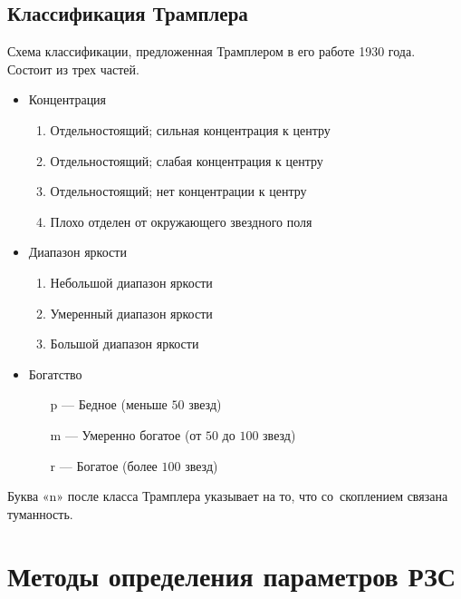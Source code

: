 \documentclass{beamer}
\begin{document}
    \subsection{Классификация Трамплера}
    \begin{frame}
        Схема классификации, предложенная Трамплером в его работе 1930 года\cite{TrumpClass}. Состоит из трех частей.
        \begin{itemize}
            \item Концентрация
                \begin{enumerate}[I ---]
                    \item Отдельностоящий; сильная концентрация к центру
                    \item Отдельностоящий; слабая концентрация к центру
                    \item Отдельностоящий; нет концентрации к центру
                    \item Плохо отделен от окружающего звездного поля
                \end{enumerate}
            \item Диапазон яркости
                \begin{enumerate}[1 ---]
                    \item Небольшой диапазон яркости
                    \item Умеренный диапазон яркости
                    \item Большой диапазон яркости
                \end{enumerate}
            \item Богатство
                \begin{enumerate}
                    \item[p ---] Бедное (меньше $50$ звезд)
                    \item[m ---] Умеренно богатое (от $50$ до $100$ звезд)
                    \item[r ---] Богатое (более $100$ звезд)
                \end{enumerate}
        \end{itemize}
        Буква «n» после класса Трамплера указывает на то, что со~скоплением связана туманность.
    \end{frame}
    \section{Методы определения параметров РЗС}
\end{document}
